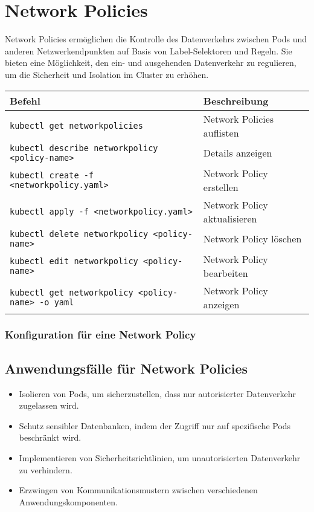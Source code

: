 \newpage

\section{Network Policies}
Network Policies ermöglichen die Kontrolle des Datenverkehrs zwischen Pods und anderen Netzwerkendpunkten auf Basis von Label-Selektoren und Regeln. Sie bieten eine Möglichkeit, den ein- und ausgehenden Datenverkehr zu regulieren, um die Sicherheit und Isolation im Cluster zu erhöhen. \\

\noindent
\begin{tabular}{
|p{}|p{}|}
\hline
\textbf{Befehl} & \textbf{Beschreibung} \\
\hline
\texttt{kubectl get networkpolicies} & Network Policies auflisten \\
\texttt{kubectl describe networkpolicy <policy-name>} & Details  anzeigen \\
\texttt{kubectl create -f <networkpolicy.yaml>} & Network Policy erstellen \\
\texttt{kubectl apply -f <networkpolicy.yaml>} & Network Policy aktualisieren\\
\texttt{kubectl delete networkpolicy <policy-name>} & Network Policy löschen \\
\texttt{kubectl edit networkpolicy <policy-name>} & Network Policy bearbeiten \\
\texttt{kubectl get networkpolicy <policy-name> -o yaml} & Network Policy anzeigen \\
\hline
\end{tabular}

\subsubsection{Konfiguration für eine Network Policy}

\newpage
\subsection{Anwendungsfälle für Network Policies}
\begin{itemize}
    \item Isolieren von Pods, um sicherzustellen, dass nur autorisierter Datenverkehr zugelassen wird.
    \item Schutz sensibler Datenbanken, indem der Zugriff nur auf spezifische Pods beschränkt wird.
    \item Implementieren von Sicherheitsrichtlinien, um unautorisierten Datenverkehr zu verhindern.
    \item Erzwingen von Kommunikationsmustern zwischen verschiedenen Anwendungskomponenten.
\end{itemize}

